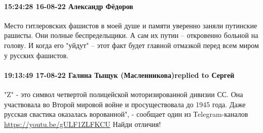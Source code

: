  
 
 
 
 

\paragraph{15:24:28 16-08-22 Александр Фёдоров}

\obeycr
Место гитлеровских фашистов в моей душе и памяти уверенно заняли путинские рашисты. 
Они полные беспредельщики. А сам их путин -- откровенно больной на голову. 
И когда его "уйдут" -- этот факт будет главной отмазкой перед всем миром у русских фашистов.
\restorecr

\paragraph{19:13:49 17-08-22 Галина Тыщук (Масленникова)replied to Сергей}

"Z" - это символ четвертой полицейской моторизированной дивизии СС. Она
участвовала во Второй мировой войне и просуществовала до 1945 года. Даже
русская свастика оказалась ворованной", - сообщает один из Тelegram-каналов
\url{https://youtu.be/gULF1ZLFKCU} Найди отличия!
